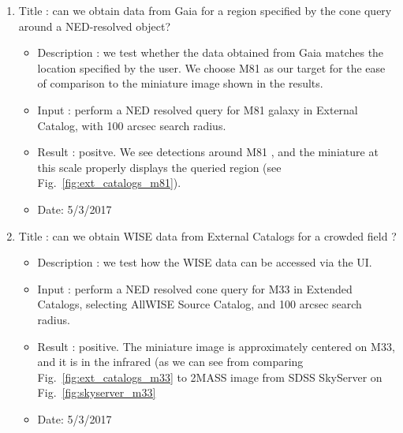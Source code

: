 \documentclass[DM,lsstdraft,toc]{lsstdoc}
\begin{document}
\begin{enumerate}
   \item Title : can we obtain data from Gaia for a region specified by the cone query around a NED-resolved object?
    \begin{itemize}
      \item Description : we test whether the data obtained from Gaia matches the location specified by the user. We choose M81 as our target for the ease of comparison to the  miniature image shown in the results.
      \item Input : perform a NED resolved  query for M81 galaxy in External Catalog, with 100 arcsec search radius.
      \item Result : positve. We see detections around M81 , and the miniature at this scale properly displays the queried region (see Fig.~\ref{fig:ext_catalogs_m81}).
      \item Date: 5/3/2017
    \end{itemize}

    \item Title : can we obtain WISE data from External Catalogs for a crowded field ?
    \begin{itemize}
      \item Description : we test how  the WISE data can be accessed via the UI.
      \item Input : perform a NED resolved  cone query  for M33  in Extended Catalogs, selecting AllWISE Source Catalog, and 100 arcsec search radius.
      \item Result : positive. The miniature image is approximately centered on M33, and it is in the infrared (as we can see from comparing Fig.~\ref{fig:ext_catalogs_m33} to 2MASS image from SDSS SkyServer on Fig.~\ref{fig:skyserver_m33}
      \item Date: 5/3/2017
    \end{itemize}
\end{enumerate}
\end{document}
